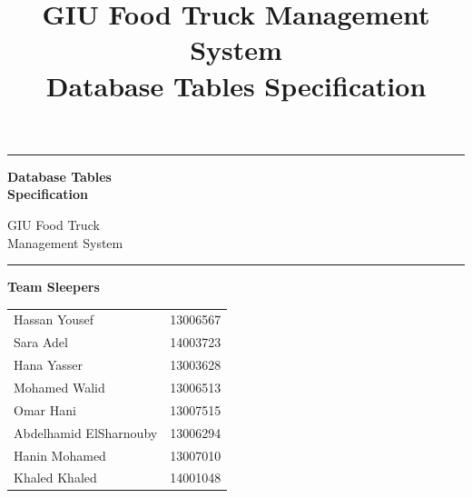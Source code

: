 \documentclass[11pt]{article}
\title{\vspace{-1cm}\Huge\textbf{\color{primaryblue}GIU Food Truck Management System}\\\vspace{0.3cm}\LARGE\color{darkgray}Database Tables Specification}
\author{}
\date{\vspace{-0.5cm}}
\begin{document}
\begin{titlepage}
    \centering
    \vspace*{2cm}
    
    {\color{primaryblue}\rule{\textwidth}{2pt}}
    
    \vspace{1.5cm}
    
    {\Huge\bfseries\color{primaryblue} Database Tables\\[0.3cm] Specification}
    
    \vspace{0.8cm}
    
    {\LARGE\color{darkgray} GIU Food Truck\\[0.2cm] Management System}
    
    \vspace{1cm}
    
    {\color{accentorange}\rule{0.6\textwidth}{1.5pt}}
    
    \vspace{2cm}
    
    \begin{tcolorbox}[colback=lightgray, colframe=primaryblue, boxrule=1.5pt, arc=4mm, width=0.8\textwidth]
        \centering
        {\Large\bfseries\color{darkgray} Team Sleepers}
        
        \vspace{0.8cm}
        
        \begin{tabular}{p{6cm}p{3cm}}
            Hassan Yousef & 13006567 \\ 
            Sara Adel & 14003723 \\
            Hana Yasser & 13003628 \\
            Mohamed Walid & 13006513 \\
            Omar Hani & 13007515 \\
            Abdelhamid ElSharnouby & 13006294 \\
            Hanin Mohamed & 13007010 \\
            Khaled Khaled & 14001048 \\
        \end{tabular}
    \end{tcolorbox}
    
    \vspace{2cm}
    

\end{titlepage}
\end{document}
